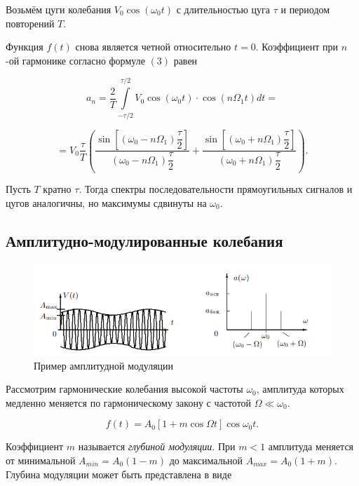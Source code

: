 Возьмём цуги колебания $V_0 \cos(\omega_0 t)$ с длительностью цуга $\tau$ и периодом повторений $T$.

Функция $f(t)$ снова является четной относительно $t = 0$. Коэффициент при $n$-ой гармонике согласно формуле $(3)$ равен

\begin{equation}
    a_n = \dfrac{2}{T}\int\limits_{-\tau/2}^{\tau/2}V_0 \cos \left(\omega_0t\right) \cdot \cos\left(n \Omega_1t\right)dt = 
\end{equation}

\[ 
    = V_0 \dfrac{\tau}{T}\left( \dfrac{\sin\left[\left(\omega_0 - n \Omega_1\right)\dfrac{\tau}{2}\right]}{\left( \omega_0 - n \Omega_1\right) \dfrac{\tau}{2}} + \dfrac{\sin\left[\left(\omega_0 + n \Omega_1\right)\dfrac{\tau}{2}\right]}{\left( \omega_0 + n \Omega_1\right) \dfrac{\tau}{2}}\right).
\]

Пусть $T$ кратно $\tau$. Тогда спектры последовательности прямоугильных сигналов и цугов аналогичны, но максимумы сдвинуты на $\omega_0$.

\subsection{Амплитудно-модулированные колебания}

\begin{figure}[h!]
    \centering
    \includegraphics[width = 12 cm]{images/theor_3.png}
    \caption{Пример амплитудной модуляции}
    \label{theor_3}
\end{figure}

Рассмотрим гармонические колебания высокой частоты $\omega_0$, амплитуда которых медленно меняется по гармоническому закону с частотой $\Omega \ll \omega_0$.

\begin{equation}
    f(t) = A_0 \left[1+m\cos \Omega t\right] \cos \omega_0 t.
\end{equation}

Коэффициент $m$ называется \textit{глубиной модуляции}. При $m < 1$ амплитуда меняется от минимальной $A_{min} = A_0(1-m)$ до максимальной $A_{max} = A_0(1+m)$. Глубина модуляции может быть представлена в виде

